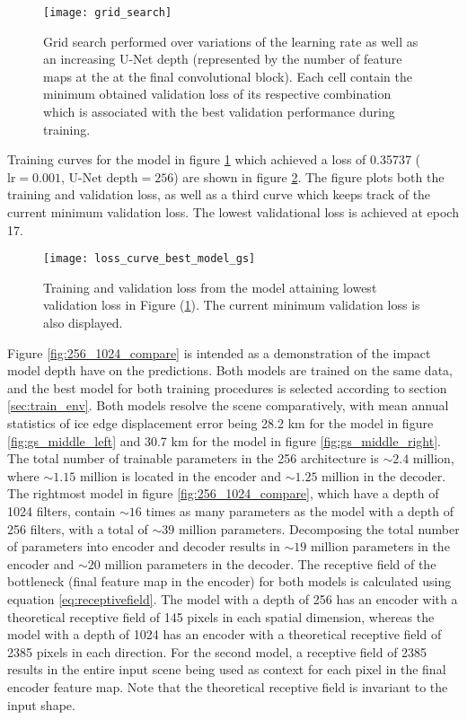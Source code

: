 \documentclass[../main/thesis]{subfiles}
\begin{document}
\begin{figure}
    \centering
    \texttt{[image: grid\_search]}
    \caption{\label{fig:gs}Grid search performed over variations of the learning rate as well as an increasing U-Net depth (represented by the number of feature maps at the at the final convolutional block). Each cell contain the minimum obtained validation loss of its respective combination which is associated with the best validation performance during training.}
\end{figure}

Training curves for the model in figure \ref{fig:gs} which achieved a loss of 0.35737 ($\text{lr} = 0.001$, $\text{U-Net depth} = 256$) are shown in figure \ref{fig:loss_curve_from_gs}. The figure plots both the training and validation loss, as well as a third curve which keeps track of the current minimum validation loss. The lowest validational loss is achieved at epoch 17. 

\begin{figure}
    \centering
    \texttt{[image: loss\_curve\_best\_model\_gs]}
    \caption{\label{fig:loss_curve_from_gs}Training and validation loss from the model attaining lowest validation loss in Figure (\ref{fig:gs}). The current minimum validation loss is also displayed.}
\end{figure}

Figure \ref{fig:256_1024_compare} is intended as a demonstration of the impact model depth have on the predictions. Both models are trained on the same data, and the best model for both training procedures is selected according to section \ref{sec:train_env}. Both models resolve the scene comparatively, with mean annual statistics of ice edge displacement error being 28.2 km for the model in figure \ref{fig:gs_middle_left} and 30.7 km for the model in figure \ref{fig:gs_middle_right}. The total number of trainable parameters in the 256 architecture is $\sim 2.4$ million, where $\sim 1.15$ million is located in the encoder and $\sim 1.25$ million in the decoder. The rightmost model in figure \ref{fig:256_1024_compare}, which have a depth of 1024 filters, contain $\sim 16$ times as many parameters as the model with a depth of 256 filters, with a total of $\sim39 $ million parameters. Decomposing the total number of parameters into encoder and decoder results in $\sim 19$ million parameters in the encoder and $\sim 20$ million parameters in the decoder. The receptive field of the bottleneck (final feature map in the encoder) for both models is calculated using equation \ref{eq:receptivefield}. The model with a depth of 256 has an encoder with a theoretical receptive field of 145 pixels in each spatial dimension, whereas the model with a depth of 1024 has an encoder with a theoretical receptive field of 2385 pixels in each direction. For the second model, a receptive field of 2385 results in the entire input scene being used as context for each pixel in the final encoder feature map. Note that the theoretical receptive field is invariant to the input shape.
\end{document}
